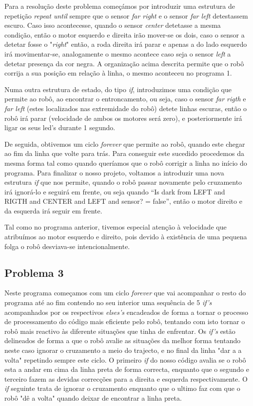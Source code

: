\documentclass[a4paper, 12pt, onecolumn, oneside]{report}
\begin{document}
Para a resolução deste problema começámos por introduzir uma estrutura de repetição \emph{repeat until} sempre que o sensor \emph{far right} e o sensor \emph{far left} detestassem escuro. Caso isso acontecesse, quando o sensor \emph{center} detetasse a mesma condição, então o motor esquerdo e direita irão mover-se os dois, caso o sensor a detetar fosse o "\emph{right}" então, a roda direita irá parar e apenas a do lado esquerdo irá movimentar-se, analogamente o mesmo acontece caso seja o sensor \emph{left} a detetar presença da cor negra. A organização acima descrita permite que o robô corrija a sua posição em relação à linha, o mesmo aconteceu no programa 1.

Numa outra estrutura de estado, do tipo \emph{if}, introduzimos uma condição que permite ao robô, ao encontrar o entroncamento, ou seja, caso o sensor \emph{far rigth} e \emph{far left} (estes localizados nas extremidade do robô) detete linhas escuras, então o robô irá parar (velocidade de ambos os motores será zero), e posteriormente irá ligar os seus led’s durante 1 segundo. 

De seguida, obtivemos um ciclo \emph{forever} que permite ao robô, quando este chegar ao fim da linha que volte para trás. Para conseguir este sucedido procedemos da mesma forma tal como quando queríamos que o robô corrigir a linha no início do programa. Para finalizar o nosso projeto, voltamos a introduzir uma nova estrutura \emph{if} que nos permite, quando o robô passar novamente pelo cruzamento irá ignorá-lo e seguirá em frente, ou seja quando “Is dark from LEFT and RIGTH and CENTER and  LEFT and sensor? = false”, então o motor direito e da esquerda irá seguir em frente.

Tal como no programa anterior, tivemos especial atenção à velocidade que atribuímos ao motor esquerdo e direito, pois devido à existência de uma pequena folga o robô desviava-se intencionalmente.

\newpage

\subsection{Problema 3}

Neste programa começamos com um ciclo \textit{forever} que vai acompanhar o resto do programa até ao fim contendo no seu interior uma sequência de 5 \textit{if's} acompanhados por os respectivos \textit{elses's} encadeados de forma a tornar o processo de processamento do código mais eficiente pelo robô, tentando com isto tornar o robô mais reactivo às diferente situações que tinha de enfrentar. Os \textit{if's} estão delineados de forma a que o robô avalie as situações da melhor forma tentando neste caso ignorar o cruzamento a meio do trajecto, e no final da linha "dar a a volta" repetindo sempre este ciclo. O primeiro \textit{if} do nosso código avalia se o robô esta a andar em cima da linha preta de forma correcta, enquanto que o segundo e terceiro fazem as devidas correcções para a direita e esquerda respectivamente. O \textit{if} seguinte trata de ignorar o cruzamento enquanto que o ultimo faz com que o robô "dê a volta" quando deixar de encontrar a linha preta.
\end{document}
